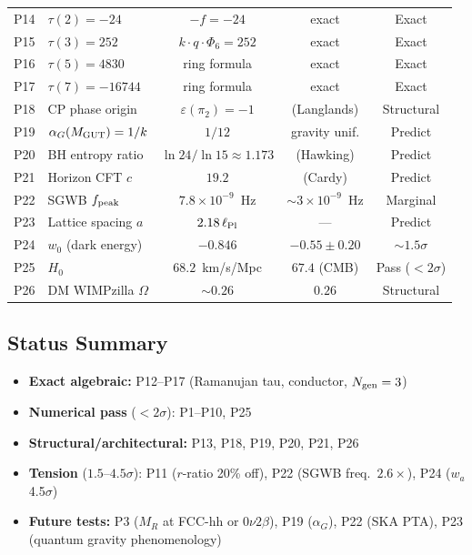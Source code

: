 \begin{table}[t]
\begin{tabular}{clccc}
P14 & $\tau(2)=-24$ & $-f=-24$ & exact & Exact \\
P15 & $\tau(3)=252$ & $k\cdot q\cdot\Phi_6=252$ & exact & Exact \\
P16 & $\tau(5)=4830$ & ring formula & exact & Exact \\
P17 & $\tau(7)=-16744$ & ring formula & exact & Exact \\
P18 & CP phase origin & $\varepsilon(\pi_2)=-1$ & (Langlands) & Structural \\
P19 & $\alpha_G(M_{\rm GUT})=1/k$ & $1/12$ & gravity unif. & Predict \\
P20 & BH entropy ratio & $\ln24/\ln15\approx1.173$ & (Hawking) & Predict \\
P21 & Horizon CFT $c$ & $19.2$ & (Cardy) & Predict \\
P22 & SGWB $f_{\rm peak}$ & $7.8\times10^{-9}$~Hz & $\sim3\times10^{-9}$~Hz & Marginal \\
P23 & Lattice spacing $a$ & $2.18\,\ell_{\rm Pl}$ & --- & Predict \\
P24 & $w_0$ (dark energy) & $-0.846$ & $-0.55\pm0.20$ & $\sim1.5\sigma$ \\
P25 & $H_0$ & $68.2$~km/s/Mpc & $67.4$ (CMB) & Pass ($<2\sigma$) \\
P26 & DM WIMPzilla $\Omega$ & $\sim0.26$ & $0.26$ & Structural \\
\bottomrule
\end{tabular}
\end{table}

\subsection{Status Summary}

\begin{itemize}
  \item \textbf{Exact algebraic:} P12--P17 (Ramanujan tau, conductor, $N_{\rm gen}=3$)
  \item \textbf{Numerical pass} ($<2\sigma$): P1--P10, P25
  \item \textbf{Structural/architectural:} P13, P18, P19, P20, P21, P26
  \item \textbf{Tension} ($1.5$--$4.5\sigma$): P11 ($r$-ratio 20\% off), P22 (SGWB freq.~$2.6\times$), P24 ($w_a$ 4.5$\sigma$)
  \item \textbf{Future tests:} P3 ($M_R$ at FCC-hh or $0\nu2\beta$), P19 ($\alpha_G$), P22 (SKA PTA), P23 (quantum gravity phenomenology)
\end{itemize}


